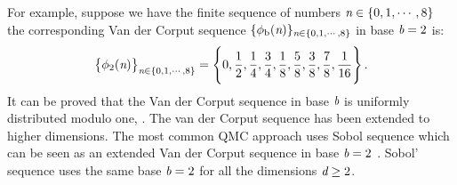 For example, suppose we have the finite sequence of numbers $\textit{n}\in \{0, 1,\cdots, 8\}$  the corresponding Van der Corput sequence 
$\{ \phi_{\textrm{b}}(\textit{n})\}_{\textit{n}\in \{0, 1,\cdots, 8\}}$ in base $\textit{b}=2$ is:
\begin{equation}
\big\{\phi_2(\textit{n})\big\}_{\textit{n}\in \{0, 1,\cdots, 8\}} = \Bigg\{0, \frac{1}{2}, \frac{1}{4}, \frac{3}{4}, \frac{1}{8},\frac{5}{8}, \frac{3}{8}, \frac{7}{8}, \frac{1}{16}\Bigg\} \,.
\end{equation}
It can be proved that the Van der Corput sequence in base $\textit{b}$ is uniformly distributed modulo one, \cite{leobacher2014introduction}. 
The van der Corput sequence has been extended to higher dimensions. 
The most common QMC approach uses Sobol sequence which can be seen as an extended Van der Corput sequence in base $\textit{b}=2$ .
Sobol' sequence uses the same base $\textit{b}=2$ for all the dimensions $\textit{d}\geq2$. 
